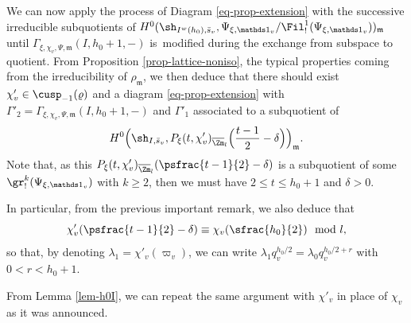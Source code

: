 \begin{enumeratea}
We can now apply the process of Diagram \eqref{eq-prop-extension} with
the successive irreducible subquotients of $H^0(\sh_{I^w(h_0),\bar s_v},
\Psi_{\xi,\mathds 1_v}/\Fil^1_!(\Psi_{\xi,\mathds 1_v}))_{\mathfrak m}$
until $\Gamma_{\xi,\chi_v,\Psi,\mathfrak m} (I,h_0+1,-)$ is~modified during
the exchange from subspace to quotient. From Proposition \ref{prop-lattice-noniso},
the typical properties coming from the irreducibility of $\rho_{\mathfrak m}$,
we then deduce that there should exist $\chi'_v \in \cusp_{-1}(\varrho)$
and a diagram \eqref{eq-prop-extension} with
\hbox{$\Gamma'_2=\Gamma_{\xi,\chi_v,\Psi,\mathfrak m} (I,h_0+1,-)$}
and $\Gamma'_1$ associated to a subquotient of
\[
H^0\Bigl(\sh_{I,\bar s_v},
P_\xi(t,\chi'_v)_{\overline \Zm_l}\Bigl(\frac{t-1}{2}-\delta\Bigr)\Bigr)_{\mathfrak m}.
\]
Note that,
as this $P_\xi(t,\chi'_v)_{\overline \Zm_l}(\psfrac{t-1}{2}- \delta)$ is a subquotient of some
$\gr^k_!(\Psi_{\xi,\mathds 1_v})$ with $k \geq 2$, then we must have
$2 \leq t \leq h_0+1$ and $\delta>0$.

In particular, from the previous important remark,
we also deduce that
\[
\chi'_v(\psfrac{t-1}{2}-\delta) \equiv
\chi_v(\sfrac{h_0}{2}) \mod l,
\]
so that, by denoting $\lambda_1=\chi'_v(\varpi_v)$,
we can write $\lambda_1 q_v^{h_0/2}=\lambda_0 q_v^{h_0/2+r}$
with $0 < r <h_0+1$.

From Lemma \ref{lem-h0I}, we can repeat the same argument
with $\chi'_v$ in place of $\chi_v$ as it was announced.
\end{enumeratea}

